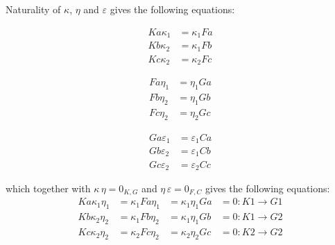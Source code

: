 \begin{example}
\noindent Naturality of $\kappa$, $\eta$ and $\varepsilon$ gives the following equations:\\
\begin{minipage}{.04\textwidth}
\phantom{}
\end{minipage}
\begin{minipage}{.28\textwidth}
\begin{subequations}
\begin{align}
Ka \kappa_{1} &=\label{eq:naturality_equations_first}
 \kappa_{1} Fa \\
Kb \kappa_{2} &= \kappa_{1} Fb \\
Kc \kappa_{2} &= \kappa_{2} Fc
\end{align}
\end{subequations}
\end{minipage}
\begin{minipage}{.04\textwidth}
\phantom{}
\end{minipage}
\begin{minipage}{.28\textwidth}
\begin{subequations}
\begin{align}
Fa \eta_{1} &= \eta_{1} Ga \\
Fb \eta_{2} &= \eta_{1} Gb \\
Fc \eta_{2} &= \eta_{2} Gc
\end{align}
\end{subequations}
\end{minipage}
\begin{minipage}{.04\textwidth}
\phantom{}
\end{minipage}
\begin{minipage}{.28\textwidth}
\begin{subequations}
\begin{align}
Ga \varepsilon_{1} &= \varepsilon_{1} Ca \\
Gb \varepsilon_{2} &= \varepsilon_{1} Cb \\
Gc \varepsilon_{2} &=\label{eq:naturality_equations_last}
 \varepsilon_{2} Cc
\end{align}
\end{subequations}
\end{minipage}
\begin{minipage}{.04\textwidth}
\phantom{}
\end{minipage}

\noindent which together with $\kappa \, \eta = 0_{K,G}$ and $\eta\, \varepsilon = 0_{F,C}$ gives the following equations:
\begin{subequations}
\begin{alignat}{4}
Ka\kappa_{1}\eta_{1} &= \kappa_{1}Fa\eta_{1} &= \kappa_{1}\eta_{1}Ga &= 0 : K1 \rightarrow G1 \\
Kb\kappa_{2}\eta_{2} &= \kappa_{1}Fb\eta_{2} &= \kappa_{1}\eta_{1}Gb &= 0 : K1 \rightarrow G2 \\
Kc\kappa_{2}\eta_{2} &= \kappa_{2}Fc\eta_{2} &= \kappa_{2}\eta_{2}Gc &= 0 : K2 \rightarrow G2
\end{alignat}
\end{subequations}


\end{example}
